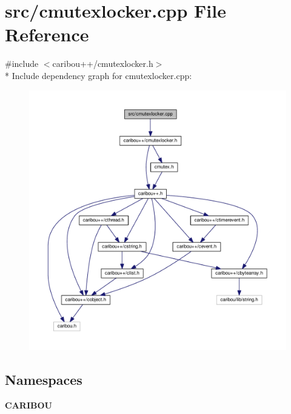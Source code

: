 \section{src/cmutexlocker.cpp File Reference}
\label{cmutexlocker_8cpp}
{\ttfamily \#include $<$caribou++/cmutexlocker.\-h$>$}\\*
Include dependency graph for cmutexlocker.\-cpp\-:\nopagebreak
\begin{figure}[H]
\begin{center}
\leavevmode
\includegraphics[width=350pt]{cmutexlocker_8cpp__incl}
\end{center}
\end{figure}
\subsection*{Namespaces}
\begin{DoxyCompactItemize}
\item 
{\bf C\-A\-R\-I\-B\-O\-U}
\end{DoxyCompactItemize}
